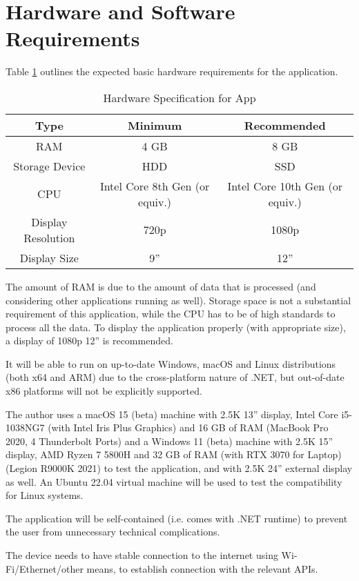 \section{Hardware and Software Requirements}

Table \ref{tab:hardware-spec} outlines the expected basic hardware requirements for the application.

\begin{table}[htp]
    \centering

    \begin{tabular}{ccc}
        Type               & Minimum                        & Recommended                     \\
        \hline
        RAM                & 4 GB                           & 8 GB                            \\
        Storage Device     & HDD                            & SSD                             \\
        CPU                & Intel Core 8th Gen (or equiv.) & Intel Core 10th Gen (or equiv.) \\
        Display Resolution & 720p                           & 1080p                           \\
        Display Size       & 9''                            & 12''
    \end{tabular}
    \caption{Hardware Specification for App}
    \label{tab:hardware-spec}
\end{table}

The amount of RAM is due to the amount of data that is processed (and considering other applications running as well). Storage space is not a substantial requirement of this application, while the CPU has to be of high standards to process all the data. To display the application properly (with appropriate size), a display of 1080p 12'' is recommended.

It will be able to run on up-to-date Windows, macOS and Linux distributions (both x64 and ARM) due to the cross-platform nature of .NET, but out-of-date x86 platforms will not be explicitly supported.

The author uses a macOS 15 (beta) machine with 2.5K 13'' display, Intel Core i5-1038NG7 (with Intel Iris Plus Graphics) and 16 GB of RAM (MacBook Pro 2020, 4 Thunderbolt Ports) and a Windows 11 (beta) machine with 2.5K 15'' display, AMD Ryzen 7 5800H and 32 GB of RAM (with RTX 3070 for Laptop) (Legion R9000K 2021) to test the application, and with 2.5K 24'' external display as well. An Ubuntu 22.04 virtual machine will be used to test the compatibility for Linux systems.

The application will be self-contained (i.e. comes with .NET runtime) to prevent the user from unnecessary technical complications.

The device needs to have stable connection to the internet using Wi-Fi/Ethernet/other means, to establish connection with the relevant APIs.